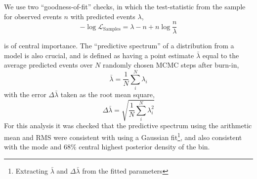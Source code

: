 We use two ``goodness-of-fit'' checks, in which the test-statistic from the sample for observed events $n$ with predicted events $\lambda$,
\begin{equation}
	-\log\mathcal{L}_\text{Samples} = \lambda-n+n\log\frac{n}{\lambda}
	\label{eq:sample_stat}
\end{equation}

\noindent is of central importance. The ``predictive spectrum'' of a distribution from a model is also crucial, and is defined as having a point estimate $\bar{\lambda}$ equal to the average predicted events over $N$ randomly chosen MCMC steps after burn-in,
\begin{equation}
\bar{\lambda} = \frac{1}{N} \sum^{N}_i \lambda_i
\end{equation}
with the error $\Delta \bar{\lambda}$ taken as the root mean square,
\begin{equation}
\Delta \bar{\lambda} = \sqrt{\frac{1}{N} \sum^{N}_i \lambda^2_i}
\end{equation}
For this analysis it was checked that the predictive spectrum using the arithmetic mean and RMS were consistent with using a Gaussian fit\footnote{Extracting $\bar{\lambda}$ and $\Delta \bar{\lambda}$ from the fitted parameters}, and also consistent with the mode and 68\% central highest posterior density of the bin.

